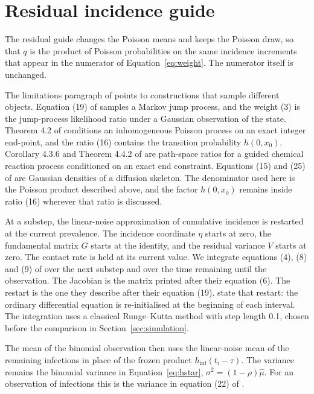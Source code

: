 \section{Residual incidence guide}
\label{sec:residual}

The residual guide changes the Poisson means and keeps the Poisson draw, so that \(q\) is the product of Poisson probabilities on the same incidence increments that appear in the numerator of Equation~\eqref{eq:weight}. The numerator itself is unchanged.

The limitations paragraph of \citet{whitaker2025} points to constructions that sample different objects. Equation (19) of \citet{golightly2019} samples a Markov jump process, and the weight (3) is the jump-process likelihood ratio under a Gaussian observation of the state. Theorem 4.2 of \citet{corstanje2023} conditions an inhomogeneous Poisson process on an exact integer end-point, and the ratio (16) contains the transition probability \(h(0, x_0)\). Corollary 4.3.6 and Theorem 4.4.2 of \citet{corstanje2024} are path-space ratios for a guided chemical reaction process conditioned on an exact end constraint. Equations (15) and (25) of \citet{whitaker2017} are Gaussian densities of a diffusion skeleton. The denominator used here is the Poisson product described above, and the factor \(h(0, x_0)\) remains inside ratio (16) wherever that ratio is discussed.

At a substep, the linear-noise approximation of cumulative incidence is restarted at the current prevalence. The incidence coordinate \(\eta\) starts at zero, the fundamental matrix \(G\) starts at the identity, and the residual variance \(V\) starts at zero. The contact rate is held at its current value. We integrate equations (4), (8) and (9) of \citet{golightly2023} over the next substep and over the time remaining until the observation. The Jacobian is the matrix printed after their equation (6). The restart is the one they describe after their equation (19). \citet[Section 4.2]{fearnhead2014} state that restart: the ordinary differential equation is re-initialised at the beginning of each interval. The integration uses a classical Runge--Kutta method with step length 0.1, chosen before the comparison in Section~\ref{sec:simulation}.

The mean of the binomial observation then uses the linear-noise mean of the remaining infections in place of the frozen product \(h_{\mathrm{inf}}(t_i - \tau)\). The variance remains the binomial variance in Equation~\eqref{eq:hstar}, \(\sigma^{2} = (1 - \rho)\hat{\mu}\). For an observation of infections this is the variance in equation (22) of \citet{golightly2023}.

